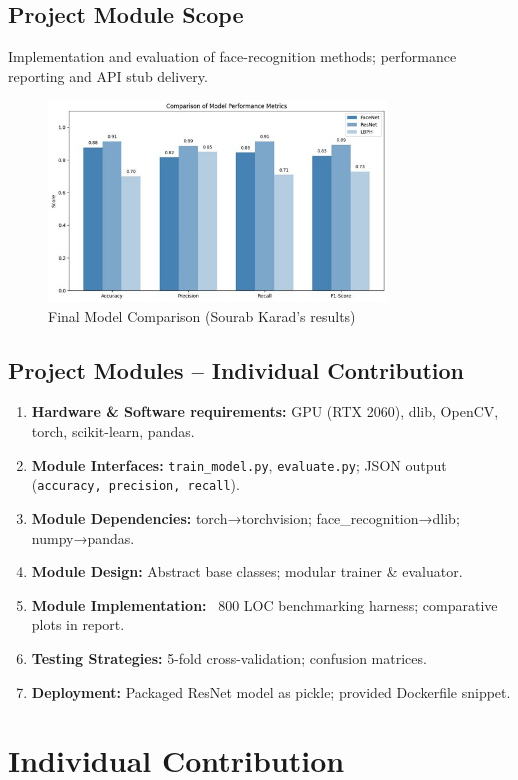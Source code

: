 \documentclass[openany]{report}
\begin{document}
\section{Project Module Scope}
Implementation and evaluation of face-recognition methods; performance reporting and API stub delivery.
\begin{figure}[H]
    \centering
    \includegraphics[width=0.8\textwidth]{../imgs/final_model_comp.jpg}
    \caption{Final Model Comparison (Sourab Karad’s results)} 
    \label{fig:sourab_graph}
\end{figure}
\section{Project Modules – Individual Contribution}
\begin{enumerate}
  \item \textbf{Hardware \& Software requirements:} GPU (RTX 2060), dlib, OpenCV, torch, scikit-learn, pandas.
  \item \textbf{Module Interfaces:} \texttt{train\_model.py}, \texttt{evaluate.py}; JSON output (\texttt{accuracy, precision, recall}).
  \item \textbf{Module Dependencies:} torch→torchvision; face\_recognition→dlib; numpy→pandas.
  \item \textbf{Module Design:} Abstract base classes; modular trainer \& evaluator.
  \item \textbf{Module Implementation:} ~800 LOC benchmarking harness; comparative plots in report.
  \item \textbf{Testing Strategies:} 5-fold cross-validation; confusion matrices.
  \item \textbf{Deployment:} Packaged ResNet model as pickle; provided Dockerfile snippet.
\end{enumerate}

\chapter{Individual Contribution}
\end{document}
